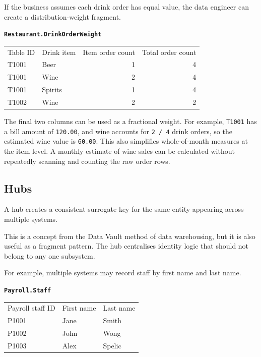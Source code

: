 \documentclass[10pt,openany,10pt]{book}
\newcounter{none}
\let\podeToprule\toprule
\let\podeMidrule\midrule
\let\podeBottomrule\bottomrule
\renewcommand{\toprule}{\arrayrulecolor{pbiGrid}\podeToprule}
\renewcommand{\midrule}{\arrayrulecolor{pbiGrid}\podeMidrule}
\renewcommand{\bottomrule}{\arrayrulecolor{pbiGrid}\podeBottomrule}
\begin{document}
If the business assumes each drink order has equal value, the data
engineer can create a distribution-weight fragment.

\textbf{\texttt{Restaurant.DrinkOrderWeight}}

{\def\LTcaptype{none} %
\begin{longtable}[]{@{}llrr@{}}
\toprule\noalign{}
Table ID & Drink item & Item order count & Total order count \\
\midrule\noalign{}
\endhead
\bottomrule\noalign{}
\endlastfoot
T1001 & Beer & 1 & 4 \\
T1001 & Wine & 2 & 4 \\
T1001 & Spirits & 1 & 4 \\
T1002 & Wine & 2 & 2 \\
\end{longtable}
}

The final two columns can be used as a fractional weight. For example,
\texttt{T1001} has a bill amount of \texttt{120.00}, and wine accounts
for \texttt{2\ /\ 4} drink orders, so the estimated wine value is
\texttt{60.00}. This also simplifies whole-of-month measures at the item
level. A monthly estimate of wine sales can be calculated without
repeatedly scanning and counting the raw order rows.

\subsection{Hubs}\label{hubs}

A hub creates a consistent surrogate key for the same entity appearing
across multiple systems.

This is a concept from the Data Vault method of data warehousing, but it
is also useful as a fragment pattern. The hub centralises identity logic
that should not belong to any one subsystem.

For example, multiple systems may record staff by first name and last
name.

\textbf{\texttt{Payroll.Staff}}

{\def\LTcaptype{none} %
\begin{longtable}[]{@{}lll@{}}
\toprule\noalign{}
Payroll staff ID & First name & Last name \\
\midrule\noalign{}
\endhead
\bottomrule\noalign{}
\endlastfoot
P1001 & Jane & Smith \\
P1002 & John & Wong \\
P1003 & Alex & Spelic \\
\end{longtable}
}
\end{document}
